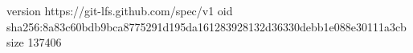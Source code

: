 version https://git-lfs.github.com/spec/v1
oid sha256:8a83c60bdb9bca8775291d195da161283928132d36330debb1e088e30111a3cb
size 137406
